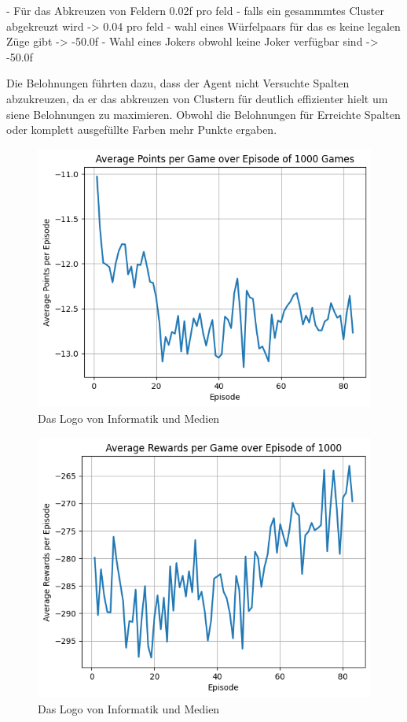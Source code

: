 - Für das Abkreuzen von Feldern 0.02f pro feld
- falls ein gesammmtes Cluster abgekreuzt wird -> 0.04 pro feld
- wahl eines Würfelpaars für das es keine legalen Züge gibt -> -50.0f
- Wahl eines Jokers obwohl keine Joker verfügbar sind -> -50.0f

Die Belohnungen führten dazu, dass der Agent nicht Versuchte Spalten abzukreuzen, da er das abkreuzen von Clustern für deutlich effizienter hielt um siene Belohnungen zu maximieren.
Obwohl die Belohnungen für Erreichte Spalten oder komplett ausgefüllte Farben mehr Punkte ergaben.


\begin{figure}[!t]
    \centering
    \includegraphics[scale=0.6]{Bilder/average_points.png}
    \caption{Das Logo von Informatik und Medien }
\end{figure}

\begin{figure}[!t]
    \centering
    \includegraphics[scale=0.6]{Bilder/average_rewards.png}
    \caption{Das Logo von Informatik und Medien }
\end{figure}

